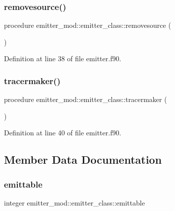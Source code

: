 \subsubsection{\texorpdfstring{removesource()}{removesource()}}
{\footnotesize\ttfamily procedure emitter\+\_\+mod\+::emitter\+\_\+class\+::removesource (\begin{DoxyParamCaption}{ }\end{DoxyParamCaption})\hspace{0.3cm}{\ttfamily [private]}}



Definition at line 38 of file emitter.\+f90.

\mbox{\label{structemitter__mod_1_1emitter__class_a35d90033d453c725390c4532cc8231f7}} 
\subsubsection{\texorpdfstring{tracermaker()}{tracermaker()}}
{\footnotesize\ttfamily procedure emitter\+\_\+mod\+::emitter\+\_\+class\+::tracermaker (\begin{DoxyParamCaption}{ }\end{DoxyParamCaption})\hspace{0.3cm}{\ttfamily [private]}}



Definition at line 40 of file emitter.\+f90.



\subsection{Member Data Documentation}
\mbox{\label{structemitter__mod_1_1emitter__class_a201a8b070193b7217c5a5c8973d76cd6}} 
\subsubsection{\texorpdfstring{emittable}{emittable}}
{\footnotesize\ttfamily integer emitter\+\_\+mod\+::emitter\+\_\+class\+::emittable\hspace{0.3cm}{\ttfamily [private]}}



